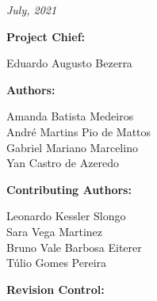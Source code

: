 %
%
%
%
%

%
%
%
%
%
%

\thispagestyle{empty}

\begin{center}

\textbf{\thetitle}

\textit{July, 2021}

\vspace{1cm}

\textbf{Project Chief:}

Eduardo Augusto Bezerra

\vspace{1cm}

\textbf{Authors:}

Amanda Batista Medeiros \\
André Martins Pio de Mattos \\
Gabriel Mariano Marcelino \\
Yan Castro de Azeredo \\

\vspace{1cm}

\textbf{Contributing Authors:}

Leonardo Kessler Slongo \\
Sara Vega Martinez \\
Bruno Vale Barbosa Eiterer \\
Túlio Gomes Pereira \\

\vspace{1cm}


\textbf{Revision Control:}

\end{center}

